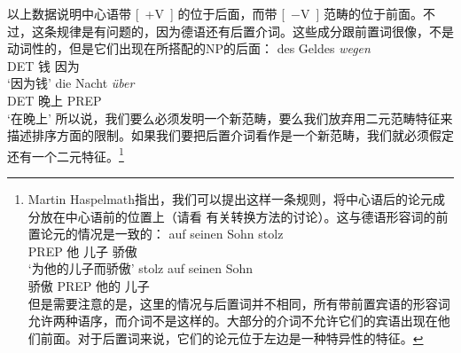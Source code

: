 \zl
以上数据说明中心语带 [~+V~] 的位于后面，而带 [~$-$V~] 范畴的位于前面。不过，这条规律是有问题的，因为德语还有后置介词。这些成分跟前置词很像，不是动词性的，但是它们出现在所搭配的NP的后面：
\eal
\ex 
\gll des Geldes \emph{wegen}\\
     DET 钱 因为\\
\glt `因为钱'
\ex 
\gll die Nacht \emph{über}\\
     DET 晚上 PREP\\
\glt `在晚上'
\zl
所以说，我们要么必须发明一个新范畴，要么我们放弃用二元范畴特征来描述排序方面的限制。如果我们要把后置介词看作是一个新范畴，我们就必须假定还有一个二元特征。\footnote{
Martin Haspelmath指出，我们可以提出这样一条规则，将中心语后的论元成分放在中心语前的位置上（请看\citealp[]{Riemsdijk78a} 有关转换方法的讨论）。这与德语形容词的前置论元的情况是一致的：
\eal
\ex
\gll auf seinen Sohn stolz\\
     PREP  他 儿子 骄傲\\
\glt `为他的儿子而骄傲'
\ex 
\gll stolz auf seinen Sohn\\
     骄傲 PREP 他的 儿子\\
\zl
但是需要注意的是，这里的情况与后置词并不相同，所有带前置宾语的形容词允许两种语序，而介词不是这样的。大部分的介词不允许它们的宾语出现在他们前面。对于后置词来说，它们的论元位于左边是一种特异性的特征。
} 
